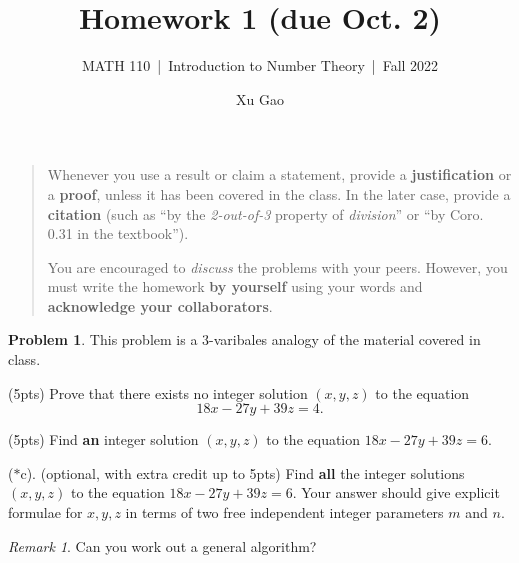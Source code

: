 \documentclass[11pt]{article}
\title{Homework 1 (due Oct. 2)}
\author{Xu Gao}
\subtitle{MATH 110~|~Introduction to Number Theory~|~Fall 2022}
\date{}
\theoremstyle{plain}
\theoremstyle{definition}
\newtheorem{problem}{Problem}
\theoremstyle{remark}
\newtheorem*{remark}{Remark}
\numberwithin{equation}{problem}
\begin{document}
\maketitle

\begin{quotation}
	Whenever you use a result or claim a statement, provide a \textbf{justification} or a \textbf{proof}, unless it has been covered in the class. In the later case, provide a \textbf{citation} (such as ``by the \emph{2-out-of-3} property of \emph{division}'' or ``by Coro. 0.31 in the textbook'').

	You are encouraged to \emph{discuss} the problems with your peers. However, you must write the homework \textbf{by yourself} using your words and \textbf{acknowledge your collaborators}.
\end{quotation}

\begin{problem}\label{p1}
	This problem is a $3$-varibales analogy of the material covered in class.
	\begin{listinprob}
		\item\label{1.a} (5pts) Prove that there exists no integer solution $(x, y, z)$ to the equation 
		\[
			18x - 27y + 39z = 4.
		\]
		\item\label{1.b} (5pts) Find \textbf{an} integer solution $(x, y, z)$ to the equation $18x - 27y + 39z = 6$. 
		\item[($\ast$c).]\label{1.c} (optional, with extra credit up to 5pts) Find \textbf{all} the integer solutions $(x, y, z)$ to the equation $18x - 27y + 39z = 6$. 
		Your answer should give explicit formulae for $x, y, z$ in terms of two free independent integer parameters $m$ and $n$.
	\end{listinprob}
	\begin{remark}
		Can you work out a general algorithm?
	\end{remark}
\end{problem}
\end{document}
